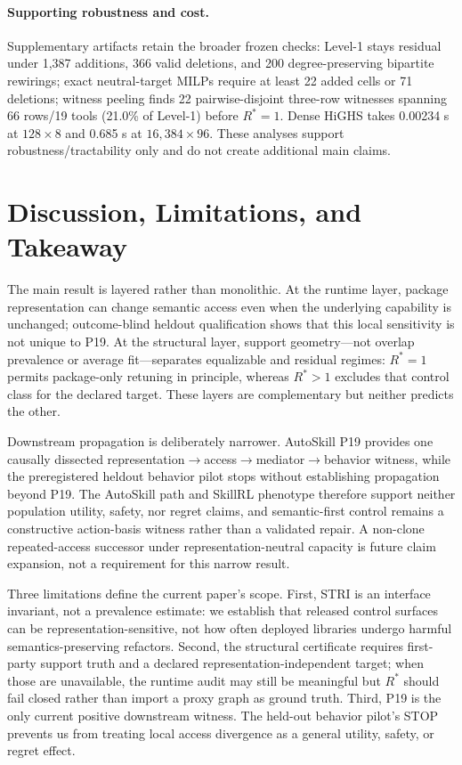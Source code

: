 \paragraph{Supporting robustness and cost.} Supplementary artifacts retain the broader frozen checks: Level-1 stays residual under 1,387 additions, 366 valid deletions, and 200 degree-preserving bipartite rewirings; exact neutral-target MILPs require at least 22 added cells or 71 deletions; witness peeling finds 22 pairwise-disjoint three-row witnesses spanning 66 rows/19 tools (21.0\% of Level-1) before $R^*=1$. Dense HiGHS takes 0.00234 s at $128\times8$ and 0.685 s at $16{,}384\times96$. These analyses support robustness/tractability only and do not create additional main claims.

\section{Discussion, Limitations, and Takeaway}
\label{sec:limitations}
The main result is layered rather than monolithic. At the runtime layer, package representation can change semantic access even when the underlying capability is unchanged; outcome-blind heldout qualification shows that this local sensitivity is not unique to P19. At the structural layer, support geometry---not overlap prevalence or average fit---separates equalizable and residual regimes: $R^*=1$ permits package-only retuning in principle, whereas $R^*>1$ excludes that control class for the declared target. These layers are complementary but neither predicts the other.

Downstream propagation is deliberately narrower. AutoSkill P19 provides one causally dissected representation$\rightarrow$access$\rightarrow$mediator$\rightarrow$behavior witness, while the preregistered heldout behavior pilot stops without establishing propagation beyond P19. The AutoSkill path and SkillRL phenotype therefore support neither population utility, safety, nor regret claims, and semantic-first control remains a constructive action-basis witness rather than a validated repair. A non-clone repeated-access successor under representation-neutral capacity is future claim expansion, not a requirement for this narrow result.

Three limitations define the current paper's scope. First, STRI is an interface invariant, not a prevalence estimate: we establish that released control surfaces can be representation-sensitive, not how often deployed libraries undergo harmful semantics-preserving refactors. Second, the structural certificate requires first-party support truth and a declared representation-independent target; when those are unavailable, the runtime audit may still be meaningful but $R^*$ should fail closed rather than import a proxy graph as ground truth. Third, P19 is the only current positive downstream witness. The held-out behavior pilot's STOP prevents us from treating local access divergence as a general utility, safety, or regret effect.

